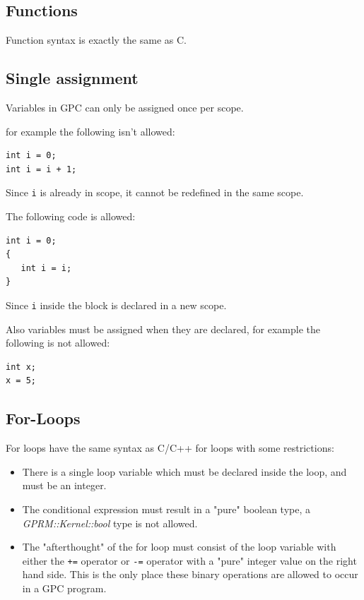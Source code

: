 \subsection{Functions}
        Function syntax is exactly the same as C. 


\subsection{Single assignment}
Variables in GPC can only be assigned once per scope.

for example the following isn't allowed:

\begin{lstlisting}[style=myGPC]
int i = 0;
int i = i + 1;
\end{lstlisting}

Since \texttt{i} is already in scope, it cannot be redefined in the same scope.

The following code is allowed:

\begin{lstlisting}[style=myGPC]
int i = 0;
{
   int i = i;
}
\end{lstlisting}

Since \texttt{i} inside the block is declared in a new scope.

Also variables must be assigned when they are declared, for example the following is not allowed:

\begin{lstlisting}[style=myGPC]
int x;
x = 5;
\end{lstlisting}

\subsection{For-Loops}
For loops have the same syntax as C/C++ for loops with some restrictions:

\begin{itemize}
\item There is a single loop variable which must be declared inside the loop, and must be an integer.

\item The conditional expression must result in a "pure" boolean type, a \textit{GPRM::Kernel::bool}
     type is not allowed.

\item The "afterthought" of the for loop must consist of the loop variable with either the \texttt{+=} operator
      or \texttt{-=} operator with a "pure" integer value on the right hand side. This is the only place these
      binary operations are allowed to occur in a GPC program. 

\end{itemize}


